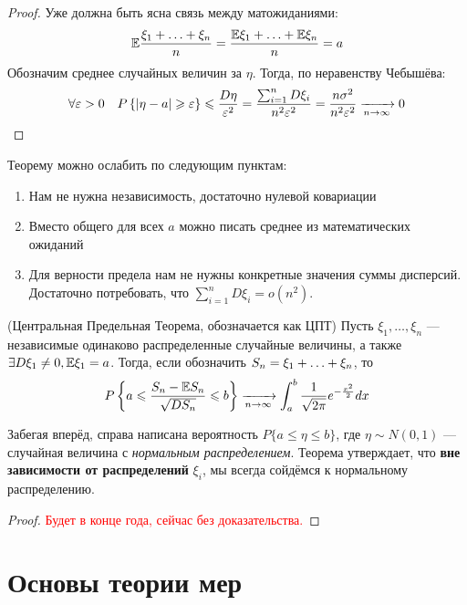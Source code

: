 \begin{proof}
	Уже должна быть ясна связь между матожиданиями:
	\[
		\mathbb{E} \frac{\xi_1 + \ldots + \xi_n}{n} = \frac{\mathbb{E}\xi_1 + \ldots + \mathbb{E}\xi_n}{n} = a
	\]
	Обозначим среднее случайных величин за $\eta$. Тогда, по неравенству Чебышёва:
	\[
		\forall \varepsilon > 0 \quad P\left\{\left|\eta - a\right| \geqslant \varepsilon\right\} \leqslant \frac{D\eta}{\varepsilon^2} = \frac{\sum_{i = 1}^n D\xi_i}{n^2 \varepsilon^2} = \frac{n\sigma^2}{n^2 \varepsilon^2} \xrightarrow[n \to \infty]{} 0
	\]
\end{proof}

\begin{note}
	Теорему можно ослабить по следующим пунктам:
	\begin{enumerate}
		\item Нам не нужна независимость, достаточно нулевой ковариации
		
		\item Вместо общего для всех $a$ можно писать среднее из математических ожиданий
		
		\item Для верности предела нам не нужны конкретные значения суммы дисперсий. Достаточно потребовать, что $\sum_{i = 1}^n D\xi_i = o(n^2)$. 
	\end{enumerate}
\end{note}

\begin{theorem} (Центральная Предельная Теорема, обозначается как ЦПТ)
	Пусть $\xi_1, \ldots, \xi_n$ --- независимые одинаково распределенные случайные величины, а также $\exists D\xi_1 \neq 0, \mathbb{E}\xi_1 = a$. Тогда, если обозначить $S_n = \xi_1 + \ldots + \xi_n$, то
	\[
		P\left\{a \leqslant \frac{S_n - \mathbb{E} S_n}{\sqrt{DS_n}} \leqslant b\right\} \xrightarrow[n \to \infty]{} \int_a^b \frac{1}{\sqrt{2\pi}} e^{-\frac{x^2}{2}}dx
	\]
\end{theorem}

\begin{note}
	Забегая вперёд, справа написана вероятность $P\{a \le \eta \le b\}$, где $\eta \sim N(0, 1)$ --- случайная величина с \textit{нормальным распределением}. Теорема утверждает, что \textbf{вне зависимости от распределений} $\xi_i$, мы всегда сойдёмся к нормальному распределению.
\end{note}

\begin{proof}
	\textcolor{red}{Будет в конце года, сейчас без доказательства.}
\end{proof}

\section{Основы теории мер}

